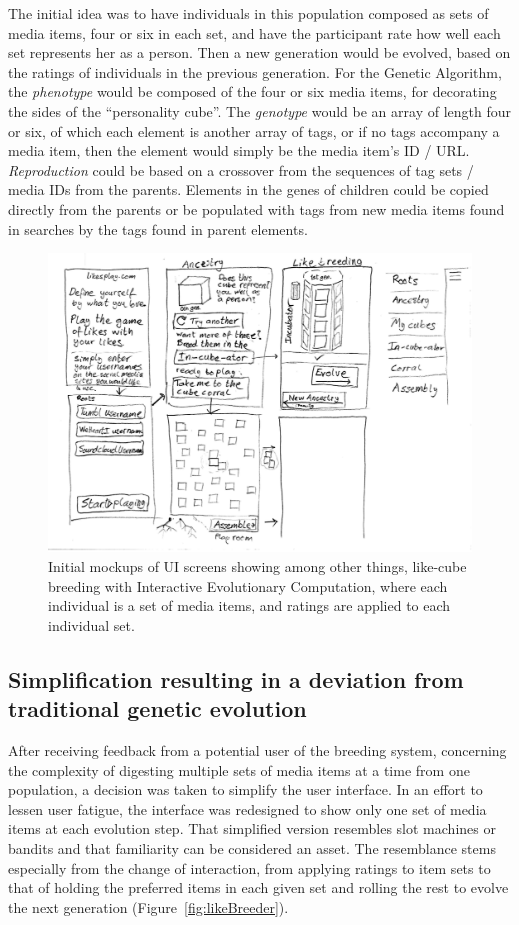 \documentclass[conference]{IEEETran}
\begin{document}
The initial idea was to have individuals in this population composed as sets of media items, four or six in each set, and have the participant rate how well each set represents her as a person.  Then a new generation would be evolved, based on the ratings of individuals in the previous generation.  For the Genetic Algorithm, the \textit{phenotype} would be composed of the four or six media items, for decorating the sides of the “personality cube”.  
The \textit{genotype} would be an array of length four or six, of which each element is another array of tags, or if no tags accompany a media item, then the element would simply be the media item's ID / URL.
\textit{Reproduction} could be based on a crossover from the sequences of tag sets / media IDs from the parents.  
Elements in the genes of children could be copied directly from the parents or be populated with tags from new media items found in searches by the tags found in parent elements.
\begin{figure}[htp]
	\centerline{\includegraphics[width=\columnwidth]{breederUImockup.png}}
	\caption{Initial mockups of UI screens showing among other things, like-cube breeding with Interactive Evolutionary Computation, where each individual is a set of media items, and ratings are applied to each individual set.}
	\label{fig:breedingMockup}
\end{figure}


\subsection{Simplification resulting in a deviation from traditional genetic evolution}
\label{sec:Simplification}
After receiving feedback from a potential user of the breeding system, concerning the complexity of digesting multiple sets of media items at a time from one population, a decision was taken to simplify the user interface.  In an effort to lessen user fatigue, the interface was redesigned to show only one set of media items at each evolution step.  That simplified version resembles slot machines or bandits and that familiarity can be considered an asset.  The resemblance stems especially from the change of interaction, from applying ratings to item sets to that of holding the preferred items in each given set and rolling the rest to evolve the next generation (Figure~\ref{fig:likeBreeder}).
\end{document}
